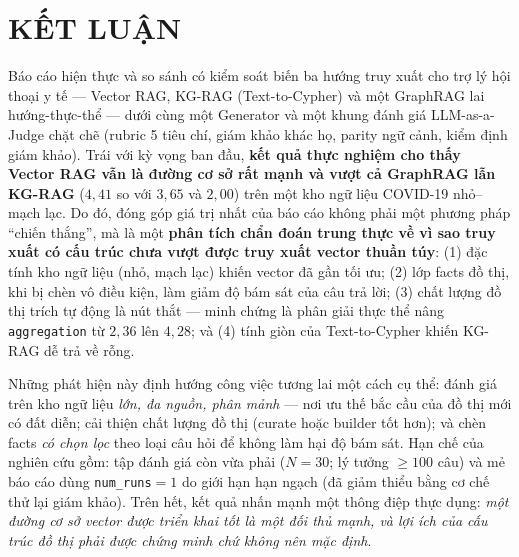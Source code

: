 \documentclass[conference]{IEEEtran}
\begin{document}
\section{KẾT LUẬN}
Báo cáo hiện thực và so sánh có kiểm soát biến ba hướng truy xuất cho trợ lý hội thoại y tế --- Vector RAG, KG-RAG (Text-to-Cypher) và một GraphRAG lai hướng-thực-thể --- dưới cùng một Generator và một khung đánh giá LLM-as-a-Judge chặt chẽ (rubric 5 tiêu chí, giám khảo khác họ, parity ngữ cảnh, kiểm định giám khảo). Trái với kỳ vọng ban đầu, \textbf{kết quả thực nghiệm cho thấy Vector RAG vẫn là đường cơ sở rất mạnh và vượt cả GraphRAG lẫn KG-RAG} ($4{,}41$ so với $3{,}65$ và $2{,}00$) trên một kho ngữ liệu COVID-19 nhỏ--mạch lạc. Do đó, đóng góp giá trị nhất của báo cáo không phải một phương pháp ``chiến thắng'', mà là một \textbf{phân tích chẩn đoán trung thực về vì sao truy xuất có cấu trúc chưa vượt được truy xuất vector thuần túy}: (1) đặc tính kho ngữ liệu (nhỏ, mạch lạc) khiến vector đã gần tối ưu; (2) lớp facts đồ thị, khi bị chèn vô điều kiện, làm giảm độ bám sát của câu trả lời; (3) chất lượng đồ thị trích tự động là nút thắt --- minh chứng là phân giải thực thể nâng \texttt{aggregation} từ $2{,}36$ lên $4{,}28$; và (4) tính giòn của Text-to-Cypher khiến KG-RAG dễ trả về rỗng.

Những phát hiện này định hướng công việc tương lai một cách cụ thể: đánh giá trên kho ngữ liệu \emph{lớn, đa nguồn, phân mảnh} --- nơi ưu thế bắc cầu của đồ thị mới có đất diễn; cải thiện chất lượng đồ thị (curate hoặc builder tốt hơn); và chèn facts \emph{có chọn lọc} theo loại câu hỏi để không làm hại độ bám sát. Hạn chế của nghiên cứu gồm: tập đánh giá còn vừa phải ($N=30$; lý tưởng $\geq 100$ câu) và mẻ báo cáo dùng \texttt{num\_runs}$=1$ do giới hạn hạn ngạch (đã giảm thiểu bằng cơ chế thử lại giám khảo). Trên hết, kết quả nhấn mạnh một thông điệp thực dụng: \emph{một đường cơ sở vector được triển khai tốt là một đối thủ mạnh, và lợi ích của cấu trúc đồ thị phải được chứng minh chứ không nên mặc định}.



\end{document}

